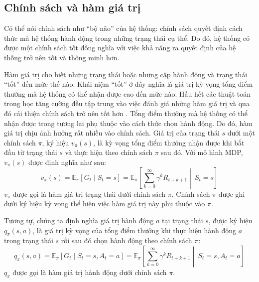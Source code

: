 
\subsection{Chính sách và hàm giá trị} \label{sec:policy_value}
Có thể nói chính sách như ``bộ não'' của hệ thống: chính sách quyết định cách thức mà hệ thống hành động trong những trạng thái cụ thể. 
Do đó, hệ thống có được một chính sách tốt đồng nghĩa với việc khả năng ra quyết định của hệ thống trở nên tốt và thông minh hơn.

Hàm giá trị cho biết những trạng thái hoặc những cặp hành động và trạng thái ``tốt'' đến mức thế nào. 
Khái niệm ``tốt'' ở đây nghĩa là giá trị kỳ vọng tổng điểm thưởng mà hệ thống có thể nhận được cao đến mức nào.
Hầu hết các thuật toán trong học tăng cường đều tập trung vào việc đánh giá những hàm giá trị và qua đó cải thiện chính sách trở nên tốt hơn \cite{sutton1998introduction}. 
Tổng điểm thưởng mà hệ thống có thể nhận được trong tương lai phụ thuộc vào cách thức chọn hành động. 
Do đó, hàm giá trị chịu ảnh hưởng rất nhiều vào chính sách. 
Giá trị của trạng thái $s$ dưới một chính sách $\pi$, ký hiệu $v_{\pi}(s)$, là kỳ vọng tổng điểm thưởng nhận được khi bắt đầu từ trạng thái $s$ và thực hiện theo chính sách $\pi$ sau đó. 
Với mô hình MDP, $v_{\pi}(s)$ được định nghĩa như sau:
\begin{equation}
v_{\pi}(s) = \mathbb{E}_{\pi}\left [\mathit{G}_t \mid \mathit{S}_{t} = s\right ] = \mathbb{E}_{\pi}\left [\sum_{k = 0}^{\infty}\gamma^{k}\mathit{R}_{t+k+1} \middle|\ \mathit{S}_t= s\right ]
\end{equation}
$v_{\pi}$ được gọi là hàm giá trị trạng thái dưới chính sách $\pi$.
Chính sách $\pi$ được ghi dưới ký hiệu kỳ vọng thể hiện việc hàm giá trị này phụ thuộc vào $\pi$.

Tương tự, chúng ta định nghĩa giá trị hành động $a$ tại trạng thái $s$, được ký hiệu $q_{\pi}(s,a)$, là giá trị kỳ vọng của tổng điểm thưởng khi thực hiện hành động $a$ trong trạng thái $s$ rồi sau đó chọn hành động theo chính sách $\pi$:
\begin{equation}
\label{action_value}
q_{\pi}(s,a) = \mathbb{E}_{\pi}\left [\mathit{G}_t \mid \mathit{S}_{t} = s, \mathit{A}_{t} = a  \right ] = \mathbb{E}_{\pi}\left [\sum_{k = 0}^{\infty}\gamma^{k}\mathit{R}_{t+k+1} \middle|\ \mathit{S}_t= s, \mathit{A}_{t} = a \right ]
\end{equation}
$q_{\pi}$ được gọi là hàm giá trị hành động dưới chính sách $\pi$.

